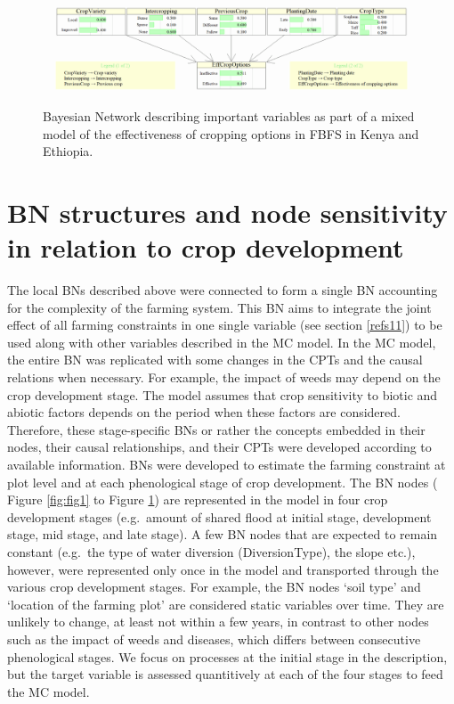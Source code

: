 \documentclass[]{elsarticle} %
\begin{document}
\begin{figure}[!h]

{\centering \includegraphics[width=1\linewidth,]{figures/Modelling_FBFS_Suppl_Effectiveness_of_cropping_options_BNs_plot} 

}

\caption{Bayesian Network describing important variables as part of a mixed model of the effectiveness of cropping options in FBFS in Kenya and Ethiopia.}\label{fig:fig6}
\end{figure}

\hypertarget{refs2}{%
\section{BN structures and node sensitivity in relation to crop development}\label{refs2}}

The local BNs described above were connected to form a single BN accounting for the complexity of the farming system. This BN aims to integrate the joint effect of all farming constraints in one single variable (see section \ref{refs11}) to be used along with other variables described in the MC model. In the MC model, the entire BN was replicated with some changes in the CPTs and the causal relations when necessary. For example, the impact of weeds may depend on the crop development stage. The model assumes that crop sensitivity to biotic and abiotic factors depends on the period when these factors are considered. Therefore, these stage-specific BNs or rather the concepts embedded in their nodes, their causal relationships, and their CPTs were developed according to available information. BNs were developed to estimate the farming constraint at plot level and at each phenological stage of crop development. The BN nodes ( Figure \ref{fig:fig1} to Figure \ref{fig:fig6}) are represented in the model in four crop development stages (e.g.~amount of shared flood at initial stage, development stage, mid stage, and late stage). A few BN nodes that are expected to remain constant (e.g.~the type of water diversion (DiversionType), the slope etc.), however, were represented only once in the model and transported through the various crop development stages. For example, the BN nodes `soil type' and `location of the farming plot' are considered static variables over time. They are unlikely to change, at least not within a few years, in contrast to other nodes such as the impact of weeds and diseases, which differs between consecutive phenological stages. We focus on processes at the initial stage in the description, but the target variable is assessed quantitively at each of the four stages to feed the MC model.
\end{document}
